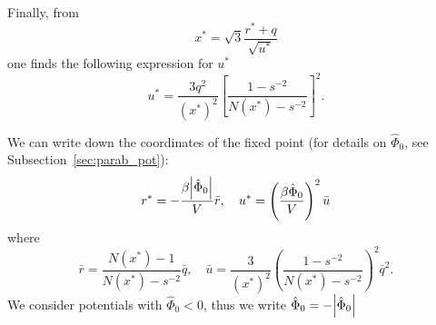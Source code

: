 Finally, from 
\begin{equation*}
	x^* = \sqrt{3} \frac{r^* + q}{\sqrt{u^*}}
\end{equation*}
one finds the following expression for $u^*$
\begin{equation*}
	u^* = \frac{3 q^2}{(x^*)^2} \left[\frac{1 - s^{-2}}{N(x^*) - s^{-2}}\right]^2.
\end{equation*}

We can write down the coordinates of the fixed point (for details on $\hat{\Phi}_0$, see Subsection~\ref{sec:parab_pot}):
\begin{equation}
	r^* = - {\frac{\beta \abs{\hat{\Phi}_0}}{V}} \bar{r}, 
	\quad 
	u^* = \left(\frac{\beta \hat{\Phi}_0}{V}\right)^2 \bar{u}
\end{equation}
where
\begin{equation*}
	\bar{r} = \frac{N(x^*) - 1}{N(x^*) - s^{-2}} \bar{q}, 
	\quad 
	\bar{u} = \frac{3}{(x^*)^2} \left(\frac{1 - s^{-2}}{N(x^*) - s^{-2}}\right)^2 \bar{q}^2.
\end{equation*}
We consider potentials with $\hat{\Phi}_0 < 0$, thus we write $\hat{\Phi}_0 = -\abs{\hat{\Phi}_0}$

